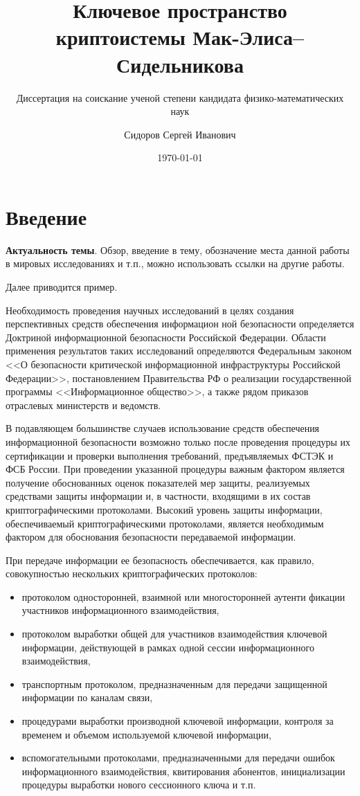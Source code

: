 \documentclass{cmcmsuthesis-phd}
\subtitle{Диссертация на соискание ученой степени кандидата физико-математических наук}
\author{Сидоров Сергей Иванович}
\date{\today}
\title{Ключевое пространство криптоистемы Мак-Элиса--Сидельникова}
\begin{document}
\maketitle
\tableofcontents

\chapter*{Введение}
\label{sec:orga7aa2da}

\textbf{Актуальность темы}.
Обзор, введение в тему, обозначение места данной работы в мировых исследованиях и т.п., можно использовать ссылки на другие
работы.

Далее приводится пример.

Необходимость проведения научных исследований в целях создания перспективных средств обеспечения информацион ной безопасности определяется Доктриной информационной безопасности Российской Федерации.
Области применения результатов таких исследований определяются Федеральным законом {}<<О безопасности критической информационной инфраструктуры Российской Федерации>>{}, постановлением Правительства РФ о реализации государственной программы {}<<Информационное общество>>{}, а также рядом приказов отраслевых министерств и ведомств.

В подавляющем большинстве случаев использование средств обеспечения информационной безопасности возможно только после проведения процедуры их сертификации и проверки выполнения требований, предъявляемых ФСТЭК и ФСБ России.
При проведении указанной процедуры важным фактором является получение обоснованных оценок показателей мер защиты, реализуемых средствами защиты информации и, в частности, входящими в их состав криптографическими протоколами.
Высокий уровень защиты информации, обеспечиваемый криптографическими протоколами, является необходимым фактором для обоснования безопасности передаваемой информации.

При передаче информации ее безопасность обеспечивается, как правило, совокупностью нескольких криптографических протоколов:
\begin{itemize}
\item протоколом односторонней, взаимной или многосторонней аутенти фикации участников информационного взаимодействия,
\item протоколом выработки общей для участников взаимодействия ключевой информации, действующей в рамках одной сессии информационного взаимодействия,
\item транспортным протоколом, предназначенным для передачи защищенной информации по каналам связи,
\item процедурами выработки производной ключевой информации, контроля за временем и объемом используемой ключевой информации,
\item вспомогательными протоколами, предназначенными для передачи ошибок информационного взаимодействия, квитирования абонентов, инициализации процедуры выработки нового сессионного ключа и т.п.
\end{itemize}
\end{document}
